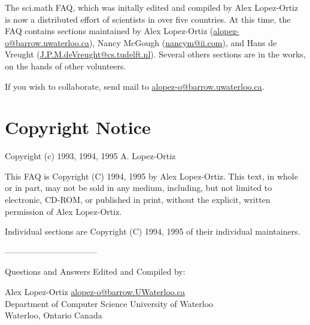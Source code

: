The sci.math FAQ, which was initally edited and compiled by Alex
Lopez-Ortiz is now a distributed effort of scientists in over five
countries. At this time, the FAQ contains sections maintained by Alex
Lopez-Ortiz (\url{alopez-o@barrow.uwaterloo.ca}), Nancy McGough
(\url{nancym@ii.com}), and Hans de Vreught
(\url{J.P.M.deVreught@cs.tudelft.nl}). Several others sections are in the
works, on the hands of other volunteers.

If you wish to collaborate, send mail to \url{alopez-o@barrow.uwaterloo.ca}.



\section{Copyright Notice}

Copyright (c) 1993, 1994, 1995   A. Lopez-Ortiz

  This FAQ is Copyright (C) 1994, 1995 by Alex Lopez-Ortiz. This text,
  in whole or in part, may not be sold in any medium, including,
  but not limited to electronic, CD-ROM, or published in print,
  without the explicit, written permission of Alex Lopez-Ortiz.

  Individual sections are Copyright (C) 1994, 1995 of their individual 
  maintainers.


---------------------------------

\noindent Questions and Answers Edited and Compiled by:

\medskip

\noindent Alex Lopez-Ortiz          \url{alopez-o@barrow.UWaterloo.ca}\\
Department of Computer Science     University of Waterloo\\
Waterloo, Ontario                             Canada\\
